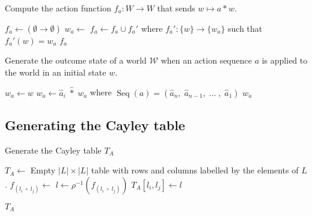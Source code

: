 \begin{algorithm}[H]
	\caption{Compute the action function $f_{a}: W \to W$ that sends $w \mapsto a \ast w$.}
        \label{alg:ComputeActionFunction}
	\hrulefill
	\begin{algorithmic}[1]
		\State $f_{a} \gets (\emptyset \to \emptyset)$
		\State $w_{a} \gets$ 
		\State $f_{a} \gets f_{a} \cup f_{a}'$ where $f_{a}': \{w\} \to \{w_{a}\}$ such that $f_{a}'(w) = w_{a}$
		\EndFor
		\State \Return $f_{a}$
		\EndProcedure
	\end{algorithmic}
\end{algorithm}


\begin{algorithm}[H]
	\caption{
		Generate the outcome state of a world $\mathscr{W}$ when an action sequence $a$ is applied to the world in an initial state $w$.
	}
	\label{alg:GenerateActionOutcome}
	\hrulefill
	\begin{algorithmic}[1]
		\State $w_{a} \gets w$
		\State $w_{a} \gets \hat{a}_{i} \; \hat{\ast} \; w_{a}$ where $\operatorname{Seq}(a) = (\hat{a}_n, \; \hat{a}_{n-1}, \; \dots \;, \; \hat{a}_1)$
		\EndFor
		\State \Return $w_{a}$
		\EndProcedure
	\end{algorithmic}
\end{algorithm}


\subsection{Generating the Cayley table}

\begin{algorithm}[H]
	\caption{
		Generate the Cayley table $T_{A}$
	}
        \label{alg:GenerateCayley}
	\hrulefill
	\begin{algorithmic}[1]
		\State $T_{A} \gets$ Empty $|L| \times |L|$ table with rows and columns labelled by the elements of $L$.
		\Statex {}
		\Statex {}
		\State $f_{(l_{i} \; \circ \; l_{j})} \gets$ 
		\State $l \gets \rho^{-1}(f_{(l_{i} \; \circ \; l_{j})})$
		\State $T_{A}[l_{i}, l_{j}] \gets l$
        

		\EndFor
		\EndFor

		\State \Return $T_{A}$
		\EndProcedure
	\end{algorithmic}
\end{algorithm}


